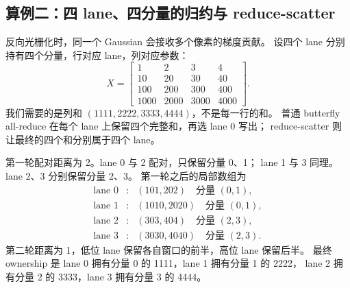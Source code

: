 \subsection{算例二：四 lane、四分量的归约与 reduce-scatter}

反向光栅化时，同一个 Gaussian 会接收多个像素的梯度贡献。
设四个 lane 分别持有四个分量，行对应 lane，列对应参数：
\[
 X=\begin{bmatrix}
 1&2&3&4\\10&20&30&40\\100&200&300&400\\1000&2000&3000&4000
 \end{bmatrix}.
\]
我们需要的是列和 \((1111,2222,3333,4444)\)，不是每一行的和。
普通 butterfly all-reduce 在每个 lane 上保留四个完整和，再选 lane 0 写出；
reduce-scatter 则让最终的四个和分别属于四个 lane。

第一轮配对距离为 2。lane 0 与 2 配对，只保留分量 0、1；
lane 1 与 3 同理。lane 2、3 分别保留分量 2、3。
第一轮之后的局部数组为
\[
 \begin{array}{ccl}
 \text{lane }0&:&(101,202)\quad\text{分量 }(0,1),\\
 \text{lane }1&:&(1010,2020)\quad\text{分量 }(0,1),\\
 \text{lane }2&:&(303,404)\quad\text{分量 }(2,3),\\
 \text{lane }3&:&(3030,4040)\quad\text{分量 }(2,3).
 \end{array}
\]
第二轮距离为 1，低位 lane 保留各自窗口的前半，高位 lane 保留后半。
最终 ownership 是 lane 0 拥有分量 0 的 1111，lane 1 拥有分量 1 的 2222，
lane 2 拥有分量 2 的 3333，lane 3 拥有分量 3 的 4444。

